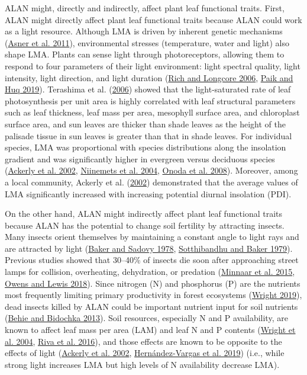 \documentclass[
  12pt,
  letterpaper,
  DIV=11,
  numbers=noendperiod]{scrartcl}
\begin{document}
ALAN might, directly and indirectly, affect plant leaf functional
traits. First, ALAN might directly affect plant leaf functional traits
because ALAN could work as a light resource. Although LMA is driven by
inherent genetic mechanisms (\protect\hyperlink{ref-Asner2011}{Asner et
al. 2011}), environmental stresses (temperature, water and light) also
shape LMA. Plants can sense light through photoreceptors, allowing them
to respond to four parameters of their light environment: light spectral
quality, light intensity, light direction, and light duration
(\protect\hyperlink{ref-Rich2006}{Rich and Longcore 2006},
\protect\hyperlink{ref-Paik2019}{Paik and Huq 2019}). Terashima et al.
(\protect\hyperlink{ref-Terashima2006}{2006}) showed that the
light-saturated rate of leaf photosynthesis per unit area is highly
correlated with leaf structural parameters such as leaf thickness, leaf
mass per area, mesophyll surface area, and chloroplast surface area, and
sun leaves are thicker than shade leaves as the height of the palisade
tissue in sun leaves is greater than that in shade leaves. For
individual species, LMA was proportional with species distributions
along the insolation gradient and was significantly higher in evergreen
versus deciduous species (\protect\hyperlink{ref-Ackerly2002}{Ackerly et
al. 2002}, \protect\hyperlink{ref-Niinemets2004}{Niinemets et al. 2004},
\protect\hyperlink{ref-Onoda2008}{Onoda et al. 2008}). Moreover, among a
local community, Ackerly et al.
(\protect\hyperlink{ref-Ackerly2002}{2002}) demonstrated that the
average values of LMA significantly increased with increasing potential
diurnal insolation (PDI).

On the other hand, ALAN might indirectly affect plant leaf functional
traits because ALAN has the potential to change soil fertility by
attracting insects. Many insects orient themselves by maintaining a
constant angle to light rays and are attracted by light
(\protect\hyperlink{ref-Baker1978}{Baker and Sadovy 1978},
\protect\hyperlink{ref-Sotthibandhu1979}{Sotthibandhu and Baker 1979}).
Previous studies showed that 30--40\% of insects die soon after
approaching street lamps for collision, overheating, dehydration, or
predation (\protect\hyperlink{ref-Minnaar2015}{Minnaar et al. 2015},
\protect\hyperlink{ref-Owens2018}{Owens and Lewis 2018}). Since nitrogen
(N) and phosphorus (P) are the nutrients most frequently limiting
primary productivity in forest ecosystems
(\protect\hyperlink{ref-Wright2019}{Wright 2019}), dead insects killed
by ALAN could be important nutrient input for soil nutrients
(\protect\hyperlink{ref-Behie2013}{Behie and Bidochka 2013}). Soil
resources, especially N and P availability, are known to affect leaf
mass per area (LAM) and leaf N and P contents
(\protect\hyperlink{ref-Wright2004}{Wright et al. 2004},
\protect\hyperlink{ref-Riva2016}{Riva et al. 2016}), and those effects
are known to be opposite to the effects of light
(\protect\hyperlink{ref-Ackerly2002}{Ackerly et al. 2002},
\protect\hyperlink{ref-Hernandez-Vargas2019}{Hernández-Vargas et al.
2019}) (i.e., while strong light increases LMA but high levels of N
availability decrease LMA).
\end{document}
